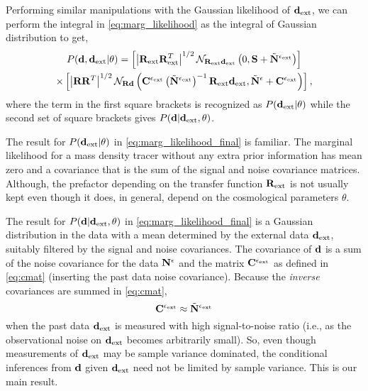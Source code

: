 \documentclass[prd, onecolumn, nofootinbib, floatfix]{revtex4-1}
\begin{document}
Performing similar manipulations with the Gaussian likelihood of $\mathbf{d}_{\rm ext}$, we can 
perform the integral in \autoref{eq:marg_likelihood} as the integral of Gaussian distribution to get,
\begin{multline}\label{eq:marg_likelihood_final}
	P(\mathbf{d}, \mathbf{d}_{\rm ext} | \theta) =
	\left[
	\left|\mathbf{R}_{\rm ext}\mathbf{R}_{\rm ext}^{T}\right|^{1/2}
	\mathcal{N}_{\mathbf{R}_{\rm ext}\mathbf{d}_{\rm ext}} \left(0, \mathbf{S} + \tilde{\mathbf{N}}^{\epsilon_{\rm ext}}\right)
	\right]
	\\ \times
	\left[
	\left|\mathbf{R}\mathbf{R}^{T}\right|^{1/2}
	\mathcal{N}_{\mathbf{R}\mathbf{d}} \left(\mathbf{C}^{\epsilon_{\rm ext}}\left(\tilde{\mathbf{N}}^{\epsilon_{\rm ext}}\right)^{-1}\mathbf{R}_{\rm ext}\mathbf{d}_{\rm ext}, 
	\tilde{\mathbf{N}}^{\epsilon} + \mathbf{C}^{\epsilon_{\rm ext}}\right)
	\right],
\end{multline}
where the term in the first square brackets is recognized as $P(\mathbf{d}_{\rm ext} | \theta)$ while the 
second set of square brackets gives $P(\mathbf{d} | \mathbf{d}_{\rm ext}, \theta)$.

The result for $P(\mathbf{d}_{\rm ext}|\theta)$ in \autoref{eq:marg_likelihood_final} is familiar. The 
marginal likelihood for a mass density tracer without any extra prior information has mean zero 
and a covariance that is the sum of the signal and noise covariance matrices. Although, the 
prefactor depending on the transfer function $\mathbf{R}_{\rm ext}$ is not usually kept even though it 
does, in general, depend on the cosmological parameters $\theta$.

The result for $P(\mathbf{d}|\mathbf{d}_{\rm ext},\theta)$ in \autoref{eq:marg_likelihood_final} is a Gaussian 
distribution in the data with a mean determined by the external data $\mathbf{d}_{\rm ext}$, suitably filtered 
by the signal and noise covariances. The covariance of $\mathbf{d}$ is a sum 
of the noise covariance for the data $\mathbf{N}^{\epsilon}$ and the matrix $\mathbf{C}^{\epsilon_{\rm ext}}$ as defined in 
\autoref{eq:cmat} (inserting the past data noise covariance). Because the \emph{inverse} 
covariances are summed in \autoref{eq:cmat},
\begin{equation}
	\mathbf{C}^{\epsilon_{\rm ext}} \approx \tilde{\mathbf{N}}^{\epsilon_{\rm ext}}
\end{equation}
when the past data $\mathbf{d}_{\rm ext}$ is measured with high signal-to-noise ratio (i.e., as the observational 
noise on $\mathbf{d}_{\rm ext}$ becomes arbitrarily small). So, even though measurements of $\mathbf{d}_{\rm ext}$ may be 
sample variance dominated, the conditional inferences from $\mathbf{d}$ given $\mathbf{d}_{\rm ext}$ need not be 
limited by sample variance. This is our main result.
\end{document}
